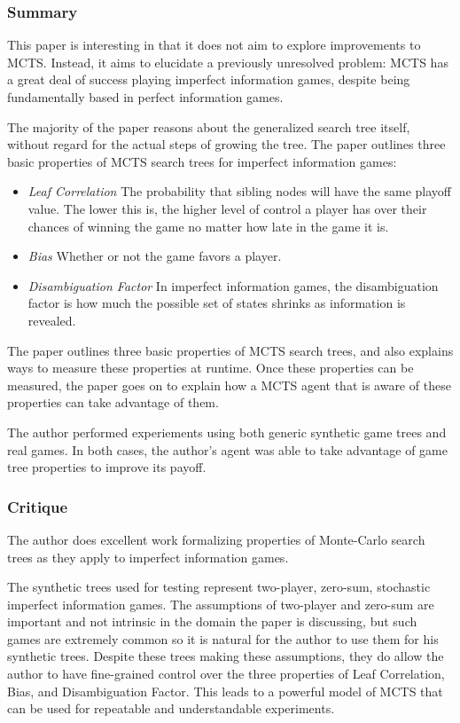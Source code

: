 \documentclass[letterpaper]{article}
\begin{document}
\subsubsection{Summary}
This paper \cite{long2010understanding} is interesting in that it does not aim to explore improvements to MCTS. Instead, it aims to elucidate a previously unresolved problem: MCTS has a great deal of success playing imperfect information games, despite being fundamentally based in perfect information games.

The majority of the paper reasons about the generalized search tree itself, without regard for the actual steps of growing the tree. The paper outlines three basic properties of MCTS search trees for imperfect information games:
\begin{itemize}
\item \emph{Leaf Correlation} The probability that sibling nodes will have the same playoff value. The lower this is, the higher level of control a player has over their chances of winning the game no matter how late in the game it is.
\item \emph{Bias} Whether or not the game favors a player.
\item \emph{Disambiguation Factor} In imperfect information games, the disambiguation factor is how much the possible set of states shrinks as information is revealed.
\end{itemize}

The paper outlines three basic properties of MCTS search trees, and also explains ways to measure these properties at runtime. Once these properties can be measured, the paper goes on to explain how a MCTS agent that is aware of these properties can take advantage of them.

The author performed experiements using both generic synthetic game trees and real games. In both cases, the author's agent was able to take advantage of game tree properties to improve its payoff.

\subsubsection{Critique}

The author does excellent work formalizing properties of Monte-Carlo search trees as they apply to imperfect information games.

The synthetic trees used for testing represent two-player, zero-sum, stochastic imperfect information games. The assumptions of two-player and zero-sum are important and not intrinsic in the domain the paper is discussing, but such games are extremely common so it is natural for the author to use them for his synthetic trees. Despite these trees making these assumptions, they do allow the author to have fine-grained control over the three properties of Leaf Correlation, Bias, and Disambiguation Factor. This leads to a powerful model of MCTS that can be used for repeatable and understandable experiments.
\end{document}
